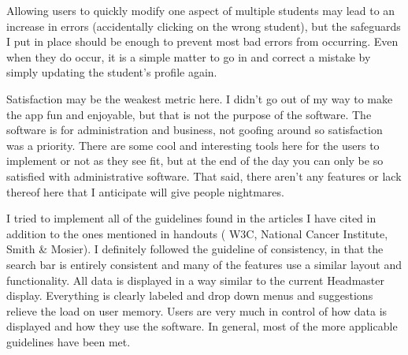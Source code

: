 \documentclass{article}
\begin{document}
Allowing users to quickly modify one aspect of multiple students may lead to an increase in errors (accidentally clicking on the wrong student), but the safeguards I put in place should be enough to prevent most bad errors from occurring. Even when they do occur, it is a simple matter to go in and correct a mistake by simply updating the student's profile again. 

Satisfaction may be the weakest  metric here. I didn't go out of my way to make the app fun and enjoyable, but that is not the purpose of the software. The software is for administration and business, not goofing around so satisfaction was a priority. There are some cool and interesting tools here for the users to implement or not as they see fit, but at the end of the day you can only be so satisfied with administrative software. That said, there aren't any features or lack thereof here that I anticipate will give people nightmares.

I tried to implement all of the guidelines found in the articles I have cited in addition to the ones mentioned in handouts ( W3C, National Cancer Institute, Smith & Mosier). I definitely followed the guideline of consistency, in that the search bar is entirely consistent and many of the features use a similar layout and functionality. All data is displayed in a way similar to the current Headmaster display. Everything is clearly labeled and drop down menus and suggestions relieve the load on user memory. Users are very much in control of how data is displayed and how they use the software. In general, most of the more applicable guidelines have been met.



\end{document}
